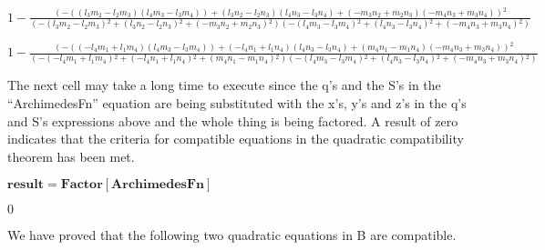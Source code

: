 \documentclass{article}
\begin{document}
\begin{doublespace}
\noindent\(1-\frac{\left(-\left(\left(l_3 m_2-l_2 m_3\right) \left(l_4 m_3-l_3 m_4\right)\right)+\left(l_3 n_2-l_2 n_3\right) \left(l_4 n_3-l_3 n_4\right)+\left(-m_3
n_2+m_2 n_3\right) \left(-m_4 n_3+m_3 n_4\right)\right){}^2}{\left(-\left(l_3 m_2-l_2 m_3\right){}^2+\left(l_3 n_2-l_2 n_3\right){}^2+\left(-m_3
n_2+m_2 n_3\right){}^2\right) \left(-\left(l_4 m_3-l_3 m_4\right){}^2+\left(l_4 n_3-l_3 n_4\right){}^2+\left(-m_4 n_3+m_3 n_4\right){}^2\right)}\)
\end{doublespace}

\begin{doublespace}
\noindent\(1-\frac{\left(-\left(\left(-l_4 m_1+l_1 m_4\right) \left(l_4 m_3-l_3 m_4\right)\right)+\left(-l_4 n_1+l_1 n_4\right) \left(l_4 n_3-l_3
n_4\right)+\left(m_4 n_1-m_1 n_4\right) \left(-m_4 n_3+m_3 n_4\right)\right){}^2}{\left(-\left(-l_4 m_1+l_1 m_4\right){}^2+\left(-l_4 n_1+l_1 n_4\right){}^2+\left(m_4
n_1-m_1 n_4\right){}^2\right) \left(-\left(l_4 m_3-l_3 m_4\right){}^2+\left(l_4 n_3-l_3 n_4\right){}^2+\left(-m_4 n_3+m_3 n_4\right){}^2\right)}\)
\end{doublespace}

The next cell may take a long time to execute since the q{'}s and the S{'}s in the {``}ArchimedesFn{''} equation are being substituted with the x{'}s,
y{'}s and z{'}s in the q{'}s and S{'}s expressions above and the whole thing is being factored. A result of zero indicates that the criteria for
compatible equations in the quadratic compatibility theorem has been met.

\begin{doublespace}
\noindent\(\pmb{\text{result} = \text{Factor}[\text{ArchimedesFn} ]}\)
\end{doublespace}

\begin{doublespace}
\noindent\(0\)
\end{doublespace}

We have proved that the following two quadratic equations in B are compatible.
\end{document}
